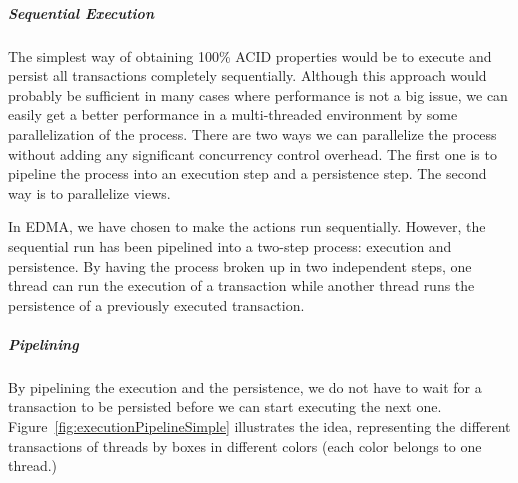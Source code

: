 \subparagraph{Sequential Execution}

The simplest way of obtaining 100\% ACID properties would be to execute
and persist all transactions completely sequentially. Although this
approach would probably be sufficient in many cases where performance
is not a big issue, we can easily get a better performance in a multi-threaded
environment by some parallelization of the process. There are two
ways we can parallelize the process without adding any significant
concurrency control overhead. The first one is to pipeline the process
into an execution step and a persistence step. The second way is to
parallelize views. 

In EDMA, we have chosen to make the actions run sequentially. However,
the sequential run has been pipelined into a two-step process: execution
and persistence. By having the process broken up in two independent
steps, one thread can run the execution of a transaction while another
thread runs the persistence of a previously executed transaction.


\subparagraph{Pipelining}

By pipelining the execution and the persistence, we do not have to
wait for a transaction to be persisted before we can start executing
the next one. Figure~\ref{fig:executionPipelineSimple} illustrates
the idea, representing the different transactions of threads by boxes
in different colors (each color belongs to one thread.)

